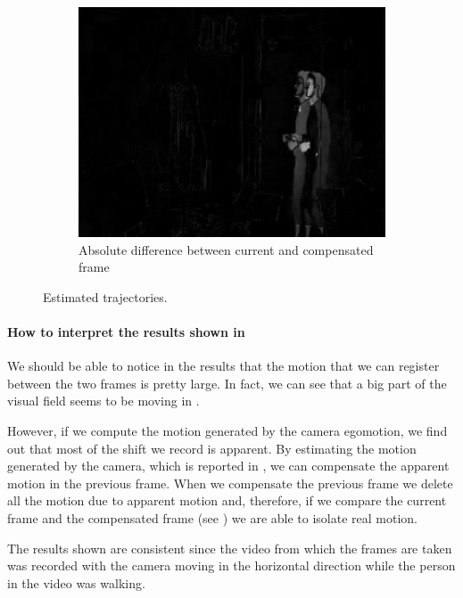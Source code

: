 \begin{figure}[htbp]
\begin{subfigure}[b]{0.3\textwidth}
        \includegraphics[width=1\textwidth]{../assets/images/04-diff-curr-comp.png}
        \caption{Absolute difference between current and compensated frame}
        \label{fig:diff-curr-comp}
    \end{subfigure}

    \caption{Estimated trajectories.}
\end{figure}

\paragraph{How to interpret the results shown in } We should be able to notice in the results that the motion that we can register between the two frames is pretty large. In fact, we can see that a big part of the visual field seems to be moving in .

However, if we compute the motion generated by the camera egomotion, we find out that most of the shift we record is apparent.
By estimating the motion generated by the camera, which is reported in  , we can compensate the apparent motion in the previous frame.
When we compensate the previous frame we delete all the motion due to apparent motion and, therefore, if we compare the current frame and the compensated frame (see ) we are able to isolate real motion.

The results shown are consistent since the video from which the frames are taken was recorded with the camera moving in the horizontal direction while the person in the video was walking.

